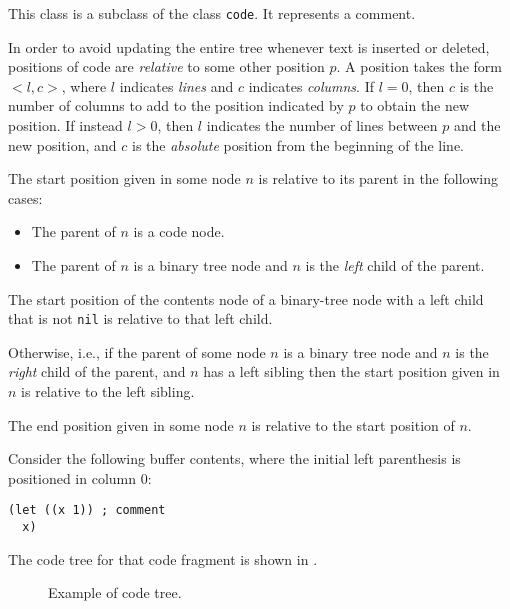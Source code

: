 
This class is a subclass of the class \texttt{code}.  It represents a
\commonlisp{} comment.

In order to avoid updating the entire tree whenever text is inserted
or deleted, positions of code are \emph{relative} to some other
position $p$.  A position takes the form $<l,c>$, where $l$ indicates
\emph{lines} and $c$ indicates \emph{columns}.  If $l = 0$, then $c$
is the number of columns to add to the position indicated by $p$ to
obtain the new position.  If instead $l > 0$, then $l$ indicates the
number of lines between $p$ and the new position, and $c$ is the
\emph{absolute} position from the beginning of the line.

The start position given in some node $n$ is relative to its parent in
the following cases:

\begin{itemize}
\item The parent of $n$ is a code node.
\item The parent of $n$ is a binary tree node and $n$ is the
  \emph{left} child of the parent.
\end{itemize}

The start position of the contents node of a binary-tree node with a
left child that is not \texttt{nil} is relative to that left child.

Otherwise, i.e., if the parent of some node $n$ is a binary tree node
and $n$ is the \emph{right} child of the parent, and $n$ has a left
sibling then the start position given in $n$ is relative to the left
sibling.

The end position given in some node $n$ is relative to the start
position of $n$.

Consider the following buffer contents, where the initial left
parenthesis is positioned in column $0$:

\begin{verbatim}
(let ((x 1)) ; comment
  x)
\end{verbatim}

The code tree for that code fragment is shown in .

\begin{figure}
\begin{center}
\end{center}
\caption{\label{fig-code-tree}
Example of code tree.}
\end{figure}

